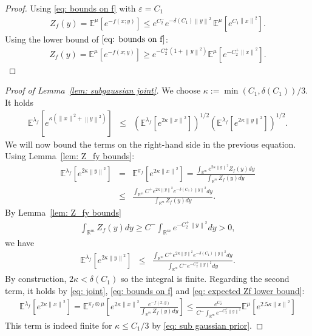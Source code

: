\documentclass{amsart}
\theoremstyle{definition}
\newcommand{\E}{{\mathbb E}}
\newcommand{\R}{{\mathbb R}}
\newcommand{\norm}[1]{\left\|#1\right\|}
\begin{document}
\begin{proof}
    Using \eqref{eq: bounds on f} with $\varepsilon = C_1$
    \begin{eqnarray*}
        Z_f(y) = \E^\mu \left[ e^{-f(x; y)} \right] \le e^{C_2^-}  e^{- \delta(C_1) \norm{y}^2} \, \E^\mu \left[ e^{C_1 \norm{x}^2} \right].
    \end{eqnarray*}
    Using the lower bound of $\eqref{eq: bounds on f}$:
    \begin{eqnarray*}
        Z_f(y) = \E^{\mu } \left[e^{-f(x; y)}\right] \ge e^{-C_2^+ (1+\norm{y}^2)} \E^\mu \left[ e^{- C_2^+ \norm{x}^2} \right] .
    \end{eqnarray*}
\end{proof}



\begin{proof}[Proof of Lemma~\ref{lem: subgaussian joint}] We choose $\kappa:=  \min\left(C_1, \delta(C_1) \right) / 3$. It holds
    \begin{eqnarray*}
        \E^{\lambda_f} \left[ e^{\kappa (\norm{x}^2 + \norm{y}^2)} \right] & \le & \left( \E^{\lambda_f} \left[e^{2 \kappa \norm{x}^2} \right]  \right)^{1/2}  \left( \E^{\lambda_f} \left[e^{2 \kappa \norm{y}^2} \right]  \right)^{1/2} .
    \end{eqnarray*}
    We will now bound the terms on the right-hand side in the previous equation.
    Using Lemma~\ref{lem: Z_fy bounds}:
    \begin{eqnarray*}
        \E^{\lambda_f} \left[e^{2 \kappa \norm{y}^2} \right] &=& \E^{\pi_f} \left[e^{2 \kappa \norm{x}^2} \right] = \frac{\int_{\R^m} e^{2 \kappa \norm{y}^2}  Z_f(y) dy }{\int_{\R^m} Z_f(y) dy} \\
         & \le &\frac{ \int_{\R^m} C^+ e^{2 \kappa \norm{y}^2} e^{-\delta(C_1) \norm{y}^2} dy}{\int_{\R^m} Z_f(y) dy} .
    \end{eqnarray*}
   By Lemma~\ref{lem: Z_fy bounds}
    \begin{eqnarray}\label{eq: expected Zf lower bound}
        \int_{\R^m}Z_f(y) dy\ge C^- \int_{\R^m}    e^{-C_2^+ \norm{y}^2} dy > 0,
    \end{eqnarray}
    we have
    \begin{eqnarray*}
        \E^{\lambda_f} \left[e^{2 \kappa \norm{y}^2} \right] &\le &\frac{\int_{\R^m} C^+ e^{2 \kappa \norm{y}^2} e^{-\delta(C_1) \norm{y}^2} dy}{\int_{\R^m}  C^-  e^{-C_2^+ \norm{y}^2} dy}.
    \end{eqnarray*}
    By construction, $2\kappa < \delta(C_1)$ so the integral is finite. Regarding the second term, it holds by \eqref{eq: joint}, \eqref{eq: bounds on f} and \eqref{eq: expected Zf lower bound}:
    \begin{eqnarray*}
        \E^{\lambda_f} \left[e^{2 \kappa \norm{x}^2} \right]  =    \E^{\pi_f \otimes \mu} \left[e^{2 \kappa \norm{x}^2} \frac{e^{-f(x, y)}}{\int_{\R^m} Z_f(y) dy} \right] \le \frac{e^{C_2^-}}{C^- \int_{\R^m }e^{-C_2^+ \norm{y}^2}} \E^{\mu} \left[e^{2.5 \kappa \norm{x}^2} \right] 
    \end{eqnarray*}
    This term is indeed finite for $\kappa \le  C_1/ 3$ by \eqref{eq: sub gaussian prior}.
\end{proof}
\end{document}
